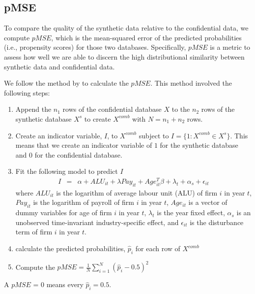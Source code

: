 \documentclass{article}
\begin{document}
\subsection{pMSE}

To compare the quality of the synthetic data relative to the confidential data, we compute $pMSE$, which is the mean-squared error of the predicted probabilities (i.e., propensity scores) for those two databases. Specifically, $pMSE$ is a metric to assess how well we are able to discern the high distributional similarity between synthetic data and confidential data. 

We follow the method by \textcite{SnokeSlavkovic2018} to calculate the $pMSE$. This method involved the following steps: 
\begin{enumerate}
    \item Append the $n_1$ rows of the confidential database $X$ to the $n_2$ rows of the synthetic database $X^s$ to create $X^{comb}$ with $N=n_1 + n_2$ rows.
    \item Create an indicator variable, $I$, to $X^{comb}$ subject to $I=\{1: X^{comb} \in X^s\}$. This means that we create an indicator variable of $1$ for the synthetic database and $0$ for the confidential database. 
    \item Fit the following model to predict $I$
    \begin{eqnarray}	
        I & = &\alpha + ALU_{it} + \lambda Pay_{it} + Age_{it}^{T}\beta + \lambda_t + \alpha_s + \epsilon_{it} \label{pMSE}
     \end{eqnarray}
    where $ALU_{it}$ is the logarithm of average labour unit (ALU) of firm $i$ in year $t$, $Pay_{it}$ is the logarithm of payroll of firm $i$ in year $t$, $Age_{it}$ is a vector of dummy variables for age of firm $i$ in year $t$, $\lambda_t$ is the year fixed effect, $\alpha_s$ is an unobserved time-invariant industry-specific effect, and $\epsilon_{it}$ is the disturbance term of firm $i$ in year $t$. 
    \item calculate the predicted probabilities, $\hat{p}_i$ for each row of $X^{comb}$
    \item Compute the $pMSE=\frac{1}{N}\sum_{i=1}^N(\hat{p}_i - 0.5)^2$
\end{enumerate}
A $pMSE$ = 0 means every $\hat{p}_i = 0.5$. 
\end{document}
